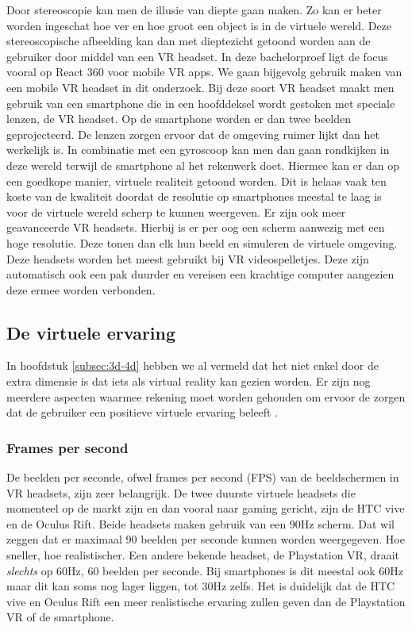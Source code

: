Door stereoscopie kan men de illusie van diepte gaan maken. Zo kan er beter worden ingeschat hoe ver en hoe groot een object is in de virtuele wereld. Deze stereoscopische afbeelding kan dan met dieptezicht getoond worden aan de gebruiker door middel van een VR headset. In deze bachelorproef ligt de focus vooral op React 360 voor mobile VR apps. We gaan bijgevolg gebruik maken van een mobile VR headset in dit onderzoek. Bij deze soort VR headset maakt men gebruik van een smartphone die in een hoofddeksel wordt gestoken met speciale lenzen, de VR headset. Op de smartphone worden er dan twee beelden geprojecteerd. De lenzen zorgen ervoor dat de omgeving ruimer lijkt dan het werkelijk is. In combinatie met een gyroscoop kan men dan gaan rondkijken in deze wereld terwijl de smartphone al het rekenwerk doet. Hiermee kan er dan op een goedkope manier, virtuele realiteit getoond worden. Dit is helaas vaak ten koste van de kwaliteit doordat de resolutie op smartphones meestal te laag is voor de virtuele wereld scherp te kunnen weergeven. Er zijn ook meer geavanceerde VR headsets. Hierbij is er per oog een scherm aanwezig met een hoge resolutie. Deze tonen dan elk hun beeld en simuleren de virtuele omgeving. Deze headsets worden het meest gebruikt bij VR videospelletjes. Deze zijn automatisch ook een pak duurder en vereisen een krachtige computer aangezien deze ermee worden verbonden.

\subsection{De virtuele ervaring}
\label{subsec:vr-ervaring}
In hoofdstuk \ref{subsec:3d-4d} hebben we al vermeld dat het niet enkel door de extra dimensie is dat iets als virtual reality kan gezien worden. Er zijn nog meerdere aspecten waarmee rekening moet worden gehouden om ervoor de zorgen dat de gebruiker een positieve virtuele ervaring beleeft \autocite{Mullis2016}.

\subsubsection{Frames per second}
\label{ssubsec:fps}
De beelden per seconde, ofwel frames per second (FPS) van de beeldschermen in VR headsets, zijn zeer belangrijk. De twee duurste virtuele headsets die momenteel op de markt zijn en dan vooral naar gaming gericht, zijn de HTC vive en de Oculus Rift. Beide headsets maken gebruik van een 90Hz scherm. Dat wil zeggen dat er maximaal 90 beelden per seconde kunnen worden weergegeven. Hoe sneller, hoe realistischer. Een andere bekende headset, de Playstation VR, draait \textit{slechts} op 60Hz, 60 beelden per seconde. Bij smartphones is dit meestal ook 60Hz maar dit kan soms nog lager liggen, tot 30Hz zelfs. Het is duidelijk dat de HTC vive en Oculus Rift een meer realistische ervaring zullen geven dan de Playstation VR of de smartphone.


